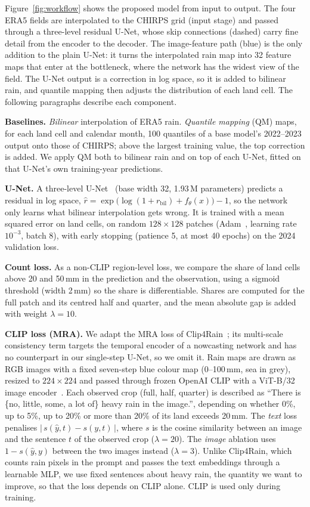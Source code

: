 \documentclass[sigconf]{acmart}
\begin{document}
Figure~\ref{fig:workflow} shows the proposed model from input to output.
The four ERA5 fields are interpolated to the CHIRPS grid (input stage) and
passed through a three-level residual U-Net, whose skip connections (dashed)
carry fine detail from the encoder to the decoder. The image-feature path
(blue) is the only addition to the plain U-Net: it turns the interpolated
rain map into 32 feature maps that enter at the bottleneck, where the
network has the widest view of the field. The U-Net output is a correction
in log space, so it is added to bilinear rain, and quantile mapping then
adjusts the distribution of each land cell. The following paragraphs
describe each component.

\textbf{Baselines.} \emph{Bilinear} interpolation of ERA5 rain.
\emph{Quantile mapping} (QM) maps, for each land cell and calendar month,
100 quantiles of a base model's 2022--2023 output onto those of CHIRPS;
above the largest training value, the top correction is added. We apply QM
both to bilinear rain and on top of each U-Net, fitted on that U-Net's own
training-year predictions.

\textbf{U-Net.} A three-level U-Net~\cite{ronneberger2015unet} (base
width 32, 1.93\,M parameters) predicts a residual in log space,
$\hat r = \exp\!\big(\log(1+r_{\mathrm{bil}}) + f_\theta(x)\big) - 1$, so
the network only learns what bilinear interpolation gets wrong. It is
trained with a mean squared error on land cells, on random
$128\times128$ patches (Adam~\cite{kingma2015adam}, learning rate
$10^{-3}$, batch 8), with early
stopping (patience 5, at most 40 epochs) on the 2024 validation loss.

\textbf{Count loss.} As a non-CLIP region-level loss, we compare the share
of land cells above 20 and 50\,mm in the prediction and the observation,
using a sigmoid threshold (width 2\,mm) so the share is differentiable.
Shares are computed for the full patch and its centred half and quarter,
and the mean absolute gap is added with weight $\lambda=10$.

\textbf{CLIP loss (MRA).} We adapt the MRA loss of
Clip4Rain~\cite{li2026clip4rain}; its multi-scale consistency term
targets the temporal encoder of a nowcasting network and has no
counterpart in our single-step U-Net, so we omit it. Rain
maps are drawn as RGB images with a fixed seven-step blue colour map
(0--100\,mm, sea in grey), resized to $224\times224$ and passed through
frozen OpenAI CLIP with a ViT-B/32 image
encoder~\cite{radford2021clip,dosovitskiy2021vit,cherti2023openclip}.
Each observed crop (full, half, quarter) is described as ``There is
\{no, little, some, a lot of\} heavy rain in the image.'', depending on
whether 0\%, up to 5\%, up to 20\% or more than 20\% of its land exceeds
20\,mm. The \emph{text} loss penalises
$|\,s(\hat y, t) - s(y, t)\,|$, where $s$ is the cosine similarity between
an image and the sentence $t$ of the observed crop ($\lambda = 20$). The
\emph{image} ablation uses $1 - s(\hat y, y)$ between the two images
instead ($\lambda=3$). Unlike Clip4Rain, which counts rain pixels in the
prompt and passes the text embeddings through a learnable MLP, we use fixed
sentences about heavy rain, the quantity we want to improve, so that the
loss depends on CLIP alone. CLIP is used only during training.
\end{document}
